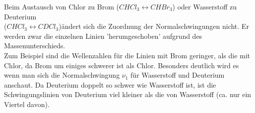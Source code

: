 Beim Austausch von Chlor zu Brom ($CHCl_3\leftrightarrow CHBr_3$) oder Wasserstoff zu Deuterium\\
($CHCl_3\leftrightarrow CDCl_3$)ändert sich die Zuordnung der Normalschwingungen nicht.
Er werden zwar die einzelnen Linien 'herumgeschoben' aufgrund des Massenunterschieds.\\
Zum Beispiel sind die Wellenzahlen für die Linien mit Brom geringer, als die mit Chlor, da Brom um einiges schwerer ist als Chlor.
Besonders deutlich wird es wenn man sich die Normalschwingung $\nu_1$ für Wasserstoff und Deuterium anschaut.
Da Deuterium doppelt so schwer wie Wasserstoff ist, ist die Schwingungslinien von Deuterium viel kleiner als die von Wasserstoff (ca. nur ein Viertel davon).
